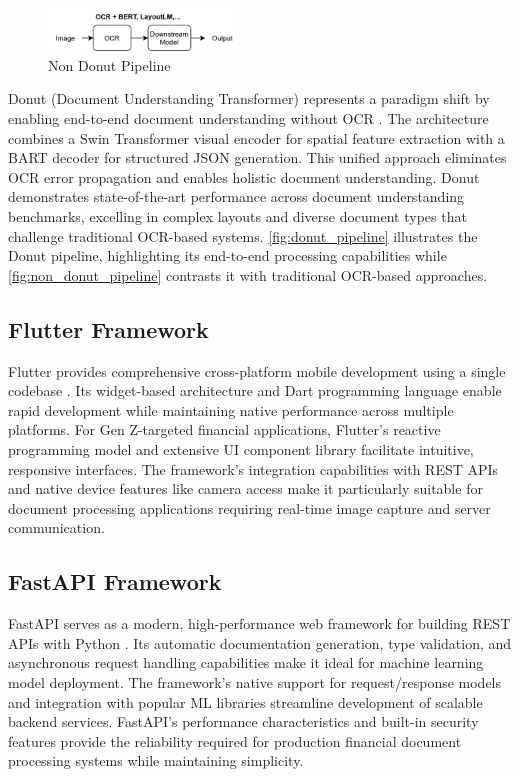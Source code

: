 \begin{figure}[htbp]
    \centerline{\includegraphics[width=0.45\textwidth]{images/non-donut-pipeline.png}}
    \caption{Non Donut Pipeline}
    \label{fig:non_donut_pipeline}
\end{figure}
Donut (Document Understanding Transformer) represents a paradigm shift by enabling end-to-end document understanding without OCR \cite{kim2021donut}. The architecture combines a Swin Transformer visual encoder for spatial feature extraction with a BART decoder \cite{lewis2019bart} for structured JSON generation. This unified approach eliminates OCR error propagation and enables holistic document understanding. Donut demonstrates state-of-the-art performance across document understanding benchmarks, excelling in complex layouts and diverse document types that challenge traditional OCR-based systems. \autoref{fig:donut_pipeline} illustrates the Donut pipeline, highlighting its end-to-end processing capabilities while \autoref{fig:non_donut_pipeline} contrasts it with traditional OCR-based approaches.

\subsection{Flutter Framework}
Flutter provides comprehensive cross-platform mobile development using a single codebase \cite{flutter2021}. Its widget-based architecture and Dart programming language enable rapid development while maintaining native performance across multiple platforms. For Gen Z-targeted financial applications, Flutter's reactive programming model and extensive UI component library facilitate intuitive, responsive interfaces. The framework's integration capabilities with REST APIs and native device features like camera access make it particularly suitable for document processing applications requiring real-time image capture and server communication.

\subsection{FastAPI Framework}
FastAPI serves as a modern, high-performance web framework for building REST APIs with Python \cite{ramirez2020fastapi}. Its automatic documentation generation, type validation, and asynchronous request handling capabilities make it ideal for machine learning model deployment. The framework's native support for request/response models and integration with popular ML libraries streamline development of scalable backend services. FastAPI's performance characteristics and built-in security features provide the reliability required for production financial document processing systems while maintaining simplicity.

